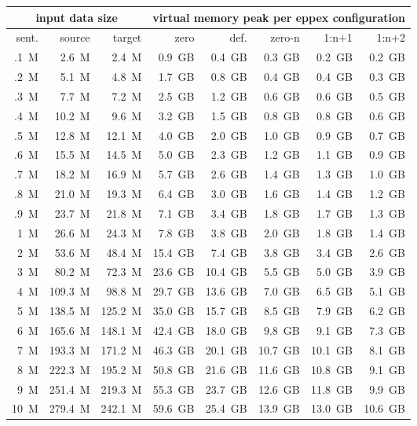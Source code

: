 \begin{table}[ht]
\centering
\begin{tabular}{ | r | r | r | r | r | r | r | r | }
\hline
\multicolumn{3}{|c|}{input data size} & \multicolumn{5}{|c|}{virtual memory peak per eppex configuration} \\
\hline
sent. & source & target & zero & def. & zero-n & 1:n+1 & 1:n+2 \\
\hline
\hline
.1~M & 2.6~M & 2.4~M & 0.9~GB & 0.4~GB & 0.3~GB & 0.2~GB & 0.2~GB \\
.2~M & 5.1~M & 4.8~M & 1.7~GB & 0.8~GB & 0.4~GB & 0.4~GB & 0.3~GB \\
.3~M & 7.7~M & 7.2~M & 2.5~GB & 1.2~GB & 0.6~GB & 0.6~GB & 0.5~GB \\
.4~M & 10.2~M & 9.6~M & 3.2~GB & 1.5~GB & 0.8~GB & 0.8~GB & 0.6~GB \\
.5~M & 12.8~M & 12.1~M & 4.0~GB & 2.0~GB & 1.0~GB & 0.9~GB & 0.7~GB \\
.6~M & 15.5~M & 14.5~M & 5.0~GB & 2.3~GB & 1.2~GB & 1.1~GB & 0.9~GB \\
.7~M & 18.2~M & 16.9~M & 5.7~GB & 2.6~GB & 1.4~GB & 1.3~GB & 1.0~GB \\
.8~M & 21.0~M & 19.3~M & 6.4~GB & 3.0~GB & 1.6~GB & 1.4~GB & 1.2~GB \\
.9~M & 23.7~M & 21.8~M & 7.1~GB & 3.4~GB & 1.8~GB & 1.7~GB & 1.3~GB \\
1~M & 26.6~M & 24.3~M & 7.8~GB & 3.8~GB & 2.0~GB & 1.8~GB & 1.4~GB \\
\hline
2~M & 53.6~M & 48.4~M & 15.4~GB & 7.4~GB & 3.8~GB & 3.4~GB & 2.6~GB \\
3~M & 80.2~M & 72.3~M & 23.6~GB & 10.4~GB & 5.5~GB & 5.0~GB & 3.9~GB \\
4~M & 109.3~M & 98.8~M & 29.7~GB & 13.6~GB & 7.0~GB & 6.5~GB & 5.1~GB \\
5~M & 138.5~M & 125.2~M & 35.0~GB & 15.7~GB & 8.5~GB & 7.9~GB & 6.2~GB \\
6~M & 165.6~M & 148.1~M & 42.4~GB & 18.0~GB & 9.8~GB & 9.1~GB & 7.3~GB \\
7~M & 193.3~M & 171.2~M & 46.3~GB & 20.1~GB & 10.7~GB & 10.1~GB & 8.1~GB \\
8~M & 222.3~M & 195.2~M & 50.8~GB & 21.6~GB & 11.6~GB & 10.8~GB & 9.1~GB \\
9~M & 251.4~M & 219.3~M & 55.3~GB & 23.7~GB & 12.6~GB & 11.8~GB & 9.9~GB \\
10~M & 279.4~M & 242.1~M & 59.6~GB & 25.4~GB & 13.9~GB & 13.0~GB & 10.6~GB \\

\end{tabular}
\end{table}
